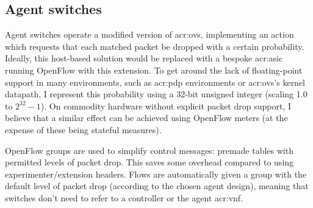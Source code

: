 \subsection{Agent switches}
Agent switches operate a modified version of \gls{acr:ovs}, implementing an action which requests that each matched packet be dropped with a certain probability.
Ideally, this host-based solution would be replaced with a bespoke \gls{acr:asic} running OpenFlow with this extension.
To get around the lack of floating-point support in many environments, such as \gls{acr:pdp} environments or \gls{acr:ovs}'s kernel datapath, I represent this probability using a 32-bit unsigned integer (scaling \num{1.0} to $2^{32}-1$).
On commodity hardware without explicit packet drop support, I believe that a similar effect can be achieved using OpenFlow meters (at the expense of these being stateful measures).

OpenFlow groups are used to simplify control messages: premade tables with permitted levels of packet drop.
This saves some overhead compared to using experimenter/extension headers.
Flows are automatically given a group with the default level of packet drop (according to the chosen agent design), meaning that switches don't need to refer to a controller or the agent \gls{acr:vnf}.

